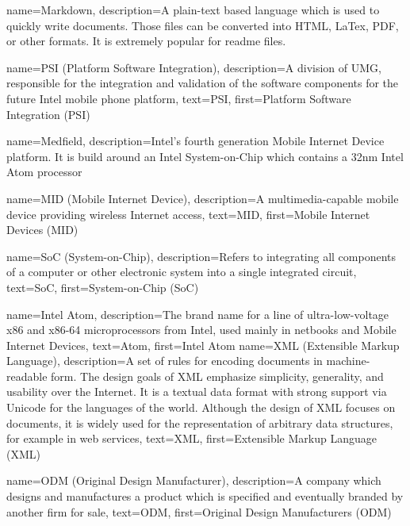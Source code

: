 {
  name=Markdown,
  description={A plain-text based language which is used to quickly write documents.
  Those files can be converted into HTML, LaTex, PDF, or other formats.
  It is extremely popular for readme files.}
}

{
  name=PSI (Platform Software Integration),
  description={A division of UMG, responsible for the integration and
    validation of the software components for the future Intel mobile
    phone platform},
  text=PSI,
  first=Platform Software Integration (PSI)
}

{
  name=Medfield,
  description={Intel's fourth generation Mobile Internet Device
    platform. It is build around an Intel System-on-Chip which
    contains a 32nm Intel Atom\textsuperscript{\texttrademark}
    processor}
}

{
  name=MID (Mobile Internet Device),
  description={A multimedia-capable mobile device providing wireless
    Internet access},
  text=MID,
  first=Mobile Internet Devices (MID)
}

{
  name=SoC (System-on-Chip),
  description={Refers to integrating all components of a computer or
    other electronic system into a single integrated circuit},
  text=SoC,
  first=System-on-Chip (SoC)
}


{
  name=Intel Atom\textsuperscript{\texttrademark},
  description={The brand name for a line of ultra-low-voltage x86 and
    x86-64 microprocessors from Intel, used mainly in netbooks and
    Mobile Internet Devices},
  text=Atom,
  first=Intel Atom\textsuperscript{\texttrademark}
}
{
  name=XML (Extensible Markup Language),
  description={A set of rules for encoding documents in
    machine-readable form. The design goals of XML emphasize
    simplicity, generality, and usability over the Internet. It is a
    textual data format with strong support via Unicode for the
    languages of the world. Although the design of XML focuses on
    documents, it is widely used for the representation of arbitrary
    data structures, for example in web services},
  text=XML,
  first=Extensible Markup Language (XML)
}

{
  name=ODM (Original Design Manufacturer),
  description={A company which designs and manufactures a product
    which is specified and eventually branded by another firm for
    sale},
  text=ODM,
  first=Original Design Manufacturers (ODM)
}

